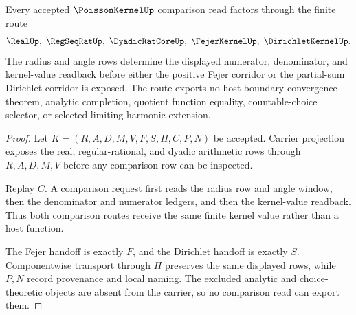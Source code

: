 \begin{theorem}\label{thm:poisson-kernel-fejer-dirichlet-handoff}
Every accepted $\PoissonKernelUp$ comparison read factors through the finite route
$$
\RealUp,\ \RegSeqRatUp,\ \DyadicRatCoreUp,\ \FejerKernelUp,\ \DirichletKernelUp .
$$
The radius and angle rows determine the displayed numerator, denominator, and kernel-value readback before either the positive Fejer corridor or the partial-sum Dirichlet corridor is exposed. The route exports no host boundary convergence theorem, analytic completion, quotient function equality, countable-choice selector, or selected limiting harmonic extension.
\end{theorem}
\begin{proof}
Let $K=(R,A,D,M,V,F,S,H,C,P,N)$ be accepted. Carrier projection exposes the real, regular-rational, and dyadic arithmetic rows through $R,A,D,M,V$ before any comparison row can be inspected.

Replay $C$. A comparison request first reads the radius row and angle window, then the denominator and numerator ledgers, and then the kernel-value readback. Thus both comparison routes receive the same finite kernel value rather than a host function.

The Fejer handoff is exactly $F$, and the Dirichlet handoff is exactly $S$. Componentwise transport through $H$ preserves the same displayed rows, while $P,N$ record provenance and local naming. The excluded analytic and choice-theoretic objects are absent from the carrier, so no comparison read can export them.
\end{proof}





